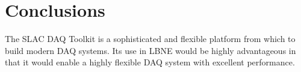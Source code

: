 \section{Conclusions}
The SLAC DAQ Toolkit is a sophisticated and flexible platform from which
to build modern DAQ systems.
Its use in LBNE would be highly advantageous in that it would enable a highly 
flexible DAQ system with excellent performance.